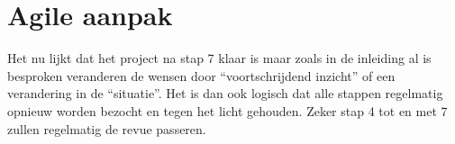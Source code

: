 \documentclass[8pt]{extarticle}
\begin{document}
\section*{Agile aanpak}
Het nu lijkt dat het project na stap 7 klaar is maar zoals in de inleiding al is besproken veranderen de wensen door “voortschrijdend inzicht” of een verandering in de “situatie”. Het is dan ook logisch dat alle stappen regelmatig opnieuw worden bezocht en tegen het licht gehouden. Zeker stap 4 tot en met 7 zullen regelmatig de revue passeren.
\end{document}
